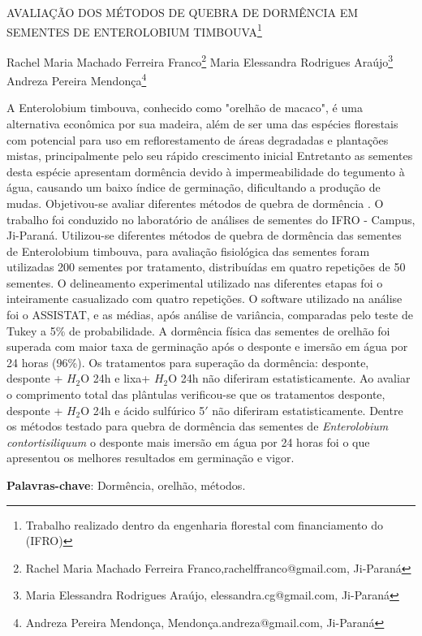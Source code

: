 \documentclass[article,12pt,onesidea,4paper,english,brazil]{abntex2}
\begin{document}
	
	
	\frenchspacing 
	
	\begin{center}
		\LARGE AVALIAÇÃO DOS MÉTODOS DE QUEBRA DE DORMÊNCIA EM SEMENTES DE
		ENTEROLOBIUM TIMBOUVA\footnote{Trabalho realizado dentro da engenharia florestal com financiamento do (IFRO)}
		
		\normalsize
		Rachel Maria Machado Ferreira Franco\footnote{Rachel Maria Machado Ferreira Franco,rachelffranco@gmail.com, Ji-Paraná} 
		Maria Elessandra Rodrigues Araújo\footnote{Maria Elessandra Rodrigues Araújo, elessandra.cg@gmail.com, Ji-Paraná} 
		Andreza Pereira
		Mendonça\footnote{Andreza Pereira Mendonça, Mendonça.andreza@gmail.com, Ji-Paraná} 
		
	\end{center}
	
	\noindent A Enterolobium timbouva, conhecido como "orelhão de macaco", é uma alternativa
	econômica por sua madeira, além de ser uma das espécies florestais com potencial
	para uso em reflorestamento de áreas degradadas e plantações mistas,
	principalmente pelo seu rápido crescimento inicial Entretanto as sementes desta
	espécie apresentam dormência devido à impermeabilidade do tegumento à água,
	causando um baixo índice de germinação, dificultando a produção de mudas.
	Objetivou-se avaliar diferentes métodos de quebra de dormência . O trabalho foi
	conduzido no laboratório de análises de sementes do IFRO - Campus, Ji-Paraná.
	Utilizou-se diferentes métodos de quebra de dormência das sementes de
	Enterolobium timbouva, para avaliação fisiológica das sementes foram utilizadas
	200 sementes por tratamento, distribuídas em quatro repetições de 50 sementes. O
	delineamento experimental utilizado nas diferentes etapas foi o inteiramente
	casualizado com quatro repetições. O software utilizado na análise foi o ASSISTAT,
	e as médias, após análise de variância, comparadas pelo teste de Tukey a 5\% de
	probabilidade. A dormência física das sementes de orelhão foi superada com maior
	taxa de germinação após o desponte e imersão em água por 24 horas (96\%). Os
	tratamentos para superação da dormência: desponte, desponte + $H_2$O 24h e lixa+
	$H_2$O 24h não diferiram estatisticamente. Ao avaliar o comprimento total das
	plântulas verificou-se que os tratamentos desponte, desponte + $H_2$O 24h e ácido
	sulfúrico 5$'$ não diferiram estatisticamente. Dentre os métodos testado para quebra
	de dormência das sementes de \textit{Enterolobium contortisiliquum} o desponte mais
	imersão em água por 24 horas foi o que apresentou os melhores resultados em
	germinação e vigor.
	
	\vspace{\onelineskip}
	
	\noindent
	\textbf{Palavras-chave}: Dormência, orelhão, métodos.
	
\end{document}
